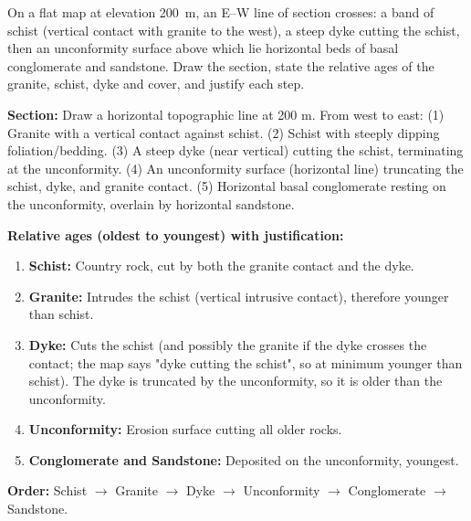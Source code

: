 \documentclass[11pt]{article}
\begin{document}
\begin{exercice}
On a flat map at elevation \SI{200}{m}, an E--W line of section crosses: a band of schist (vertical contact with granite to the west), a steep dyke cutting the schist, then an unconformity surface above which lie horizontal beds of basal conglomerate and sandstone. Draw the section, state the relative ages of the granite, schist, dyke and cover, and justify each step.
\end{exercice}

\begin{corrige}
\textbf{Section:} Draw a horizontal topographic line at 200 m. From west to east: (1) Granite with a vertical contact against schist. (2) Schist with steeply dipping foliation/bedding. (3) A steep dyke (near vertical) cutting the schist, terminating at the unconformity. (4) An unconformity surface (horizontal line) truncating the schist, dyke, and granite contact. (5) Horizontal basal conglomerate resting on the unconformity, overlain by horizontal sandstone.

\textbf{Relative ages (oldest to youngest) with justification:}
\begin{enumerate}
\item \textbf{Schist:} Country rock, cut by both the granite contact and the dyke.
\item \textbf{Granite:} Intrudes the schist (vertical intrusive contact), therefore younger than schist.
\item \textbf{Dyke:} Cuts the schist (and possibly the granite if the dyke crosses the contact; the map says "dyke cutting the schist", so at minimum younger than schist). The dyke is truncated by the unconformity, so it is older than the unconformity.
\item \textbf{Unconformity:} Erosion surface cutting all older rocks.
\item \textbf{Conglomerate and Sandstone:} Deposited on the unconformity, youngest.
\end{enumerate}
\textbf{Order:} Schist $\rightarrow$ Granite $\rightarrow$ Dyke $\rightarrow$ Unconformity $\rightarrow$ Conglomerate $\rightarrow$ Sandstone.
\end{corrige}
\end{document}

